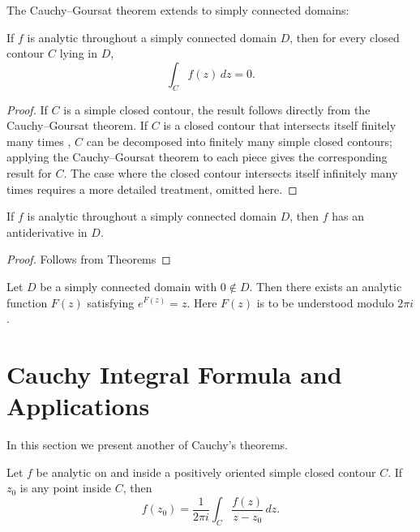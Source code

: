 \documentclass{article}
\begin{document}
The Cauchy--Goursat theorem extends to simply connected domains:

\begin{theorem}
If $f$ is analytic throughout a simply connected domain $D$, then for every closed contour $C$ lying in $D$,
\[
\int_C f(z)\,dz = 0.
\]
\end{theorem}

\begin{proof}
If $C$ is a simple closed contour, the result follows directly from the Cauchy--Goursat theorem. If $C$ is a closed contour that intersects itself finitely many times , $C$ can be decomposed into finitely many simple closed contours; applying the Cauchy--Goursat theorem to each piece gives the corresponding result for $C$. The case where the closed contour intersects itself infinitely many times requires a more detailed treatment, omitted here.
\end{proof}

\begin{corollary}
If $f$ is analytic throughout a simply connected domain $D$, then $f$ has an antiderivative in $D$.
\end{corollary}
\begin{proof}
Follows from Theorems 
\end{proof}

\begin{theorem}
Let $D$ be a simply connected domain with $0\notin D$. Then there exists an analytic function $F(z)$ satisfying $e^{F(z)} = z$. Here $F(z)$ is to be understood modulo $2\pi i$.
\end{theorem}

\section*{Cauchy Integral Formula and Applications}

In this section we present another of Cauchy's theorems.

\begin{theorem}
Let $f$ be analytic on and inside a positively oriented simple closed contour $C$. If $z_0$ is any point inside $C$, then
\[
f(z_0) = \frac{1}{2\pi i}\int_C \frac{f(z)}{z-z_0}\,dz. 
\]
\end{theorem}
\end{document}

